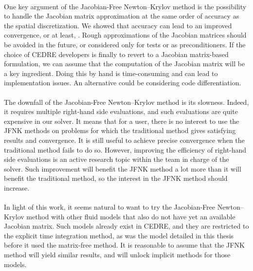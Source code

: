     \paragraph{}
    One key argument of the Jacobian-Free Newton--Krylov method is the possibility to handle the Jacobian matrix approximation at the same order of accuracy as the spatial discretization.
    We showed that accuracy can lead to an improved convergence, or at least, .
    Rough approximations of the Jacobian matrices should be avoided in the future, or considered only for tests or as preconditioners.
    If the choice of CEDRE developers is finally to revert to a Jacobian matrix-based formulation, we can assume that the computation of the Jacobian matrix will be a key ingredient.
    Doing this by hand is time-consuming and can lead to implementation issues.
    An alternative could be considering code differentiation.

    \paragraph{}
    The downfall of the Jacobian-Free Newton--Krylov method is its slowness.
    Indeed, it requires multiple right-hand side evaluations, and such evaluations are quite expensive in our solver.
    It means that for a user, there is no interest to use the JFNK methods on problems for which the traditional method gives satisfying results and convergence.
    It is still useful to achieve precise convergence when the traditional method fails to do so.
    However, improving the efficiency of right-hand side evaluations is an active research topic within the team in charge of the solver.
    Such improvement will benefit the JFNK method a lot more than it will benefit the traditional method, so the interest in the JFNK method should increase.

    \paragraph{}
    In light of this work, it seems natural to want to try the Jacobian-Free Newton--Krylov method with other fluid models that also do not have yet an available Jacobian matrix.
    Such models already exist in CEDRE, and they are restricted to the explicit time integration method, as was the model detailed in this thesis before it used the matrix-free method.
    It is reasonable to assume that the JFNK method will yield similar results, and will unlock implicit methods for those models.

